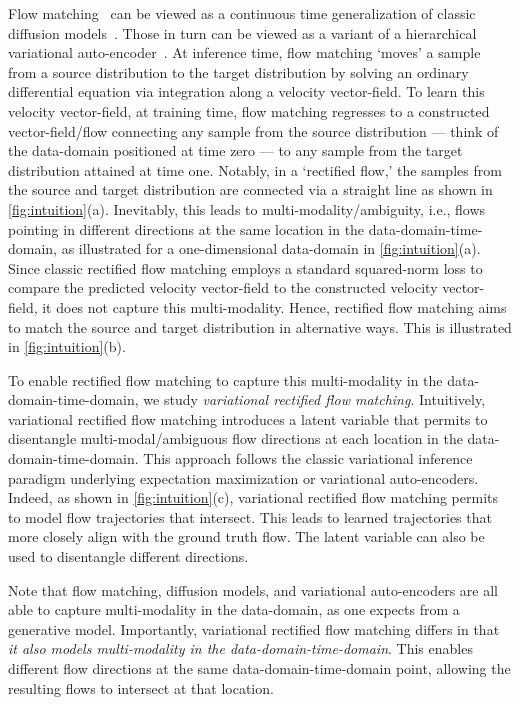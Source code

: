 Flow matching~\citep{LipmanICLR2023,liu2023flow,albergo2023building} can be viewed as a continuous time generalization of classic diffusion models~\citep{albergo2023stochastic,ma2024sit}. Those in turn can be viewed as 
a variant of a hierarchical variational auto-encoder~\citep{luo2022understanding}. At inference time, flow matching `moves' a sample from a source distribution  to the target distribution by solving an ordinary differential equation via integration along a velocity vector-field. To learn this velocity vector-field, at training time, flow matching regresses to a constructed vector-field/flow connecting any sample from the source distribution --- think of the data-domain positioned at time zero --- to any sample from the target distribution attained at time one. Notably, in a `rectified flow,' the samples from the source and target distribution are connected via a straight line as shown in \cref{fig:intuition}(a). Inevitably, this leads to multi-modality/ambiguity, i.e.,  flows pointing in different directions at the same location in the data-domain-time-domain, as illustrated for a one-dimensional data-domain in \cref{fig:intuition}(a). Since classic rectified flow matching employs a standard squared-norm loss to compare the predicted velocity vector-field to the constructed velocity vector-field, it does not capture this multi-modality. Hence, rectified flow matching aims to match the source and target distribution in alternative ways. %
This is illustrated in \cref{fig:intuition}(b).

To enable rectified flow matching to capture this multi-modality in the data-domain-time-domain, we study \emph{variational rectified flow matching}. Intuitively, variational rectified flow matching introduces a latent variable that permits to disentangle multi-modal/ambiguous flow directions at each location in the data-domain-time-domain. This approach follows the classic variational inference paradigm underlying expectation maximization or variational auto-encoders. Indeed, as shown in \cref{fig:intuition}(c),  variational rectified flow matching permits to model flow trajectories that intersect. 
This leads to learned trajectories that more closely align with the ground truth flow.
The latent variable can also be used to disentangle different directions.

Note that flow matching, diffusion models, and  variational auto-encoders are all able to capture multi-modality in the data-domain, as one expects from a generative model. Importantly, variational rectified flow matching differs in that \textit{it  also models multi-modality in the data-domain-time-domain}. This enables different flow directions at the same data-domain-time-domain point, allowing the resulting flows to intersect at that location.


